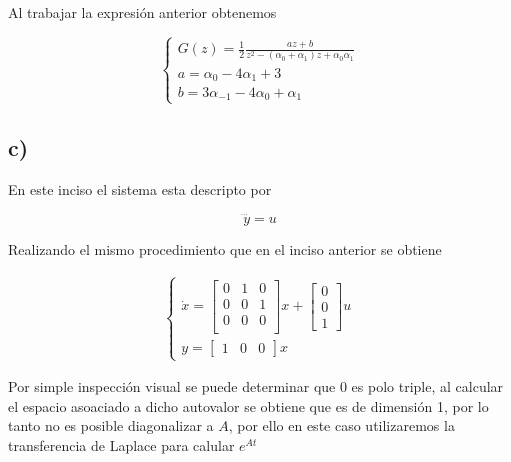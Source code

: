 \documentclass{article}
\newcommand{\syseq}[1]{ \left\{  
                            \begin{array}{c}
                                #1
                            \end{array}
                        \right. }
\begin{document}
        Al trabajar la expresión anterior obtenemos 

        \begin{equation}
            \syseq{
                G(z) = \frac{1}{2}\frac{az + b}{z^2 - ( \alpha_0 + \alpha_1 )z + \alpha_0\alpha_1}\\
                a=\alpha_0 -4\alpha_1+3\\
                b=3\alpha_{-1}-4\alpha_0+\alpha_1
            }
        \end{equation}

    \subsection{c)}
    
        En este inciso el sistema esta descripto por 

        \begin{equation}
            \dddot{ y } = u
        \end{equation}

        Realizando el mismo procedimiento que en el inciso anterior se obtiene 

        \begin{eqnarray}
            \left\{
                \begin{array}{c}
                    \dot{x} = 
                    \begin{bmatrix}
                        0 & 1 & 0 \\
                        0 & 0 & 1 \\
                        0 & 0 & 0 \\
                    \end{bmatrix} x +
                    \begin{bmatrix}
                        0 \\ 0 \\ 1
                    \end{bmatrix} u\\ 
                    y = 
                        \begin{bmatrix}
                            1 & 0 & 0
                        \end{bmatrix} x
                \end{array}
            \right.
        \end{eqnarray}

        Por simple inspección visual se puede determinar que $0$ es polo triple, al calcular el espacio asoaciado a dicho autovalor 
        se obtiene que es de dimensión 1, por lo tanto no es posible diagonalizar a $A$, por ello en este caso utilizaremos la transferencia de Laplace para calular
        $e^{At}$
\end{document}
